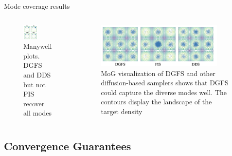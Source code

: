 \documentclass[aspectratio=169,xcolor=dvipsnames]{beamer}
\begin{document}
\begin{frame}[t]{Mode coverage results}

\begin{columns}[t]
\begin{column}{0.48\textwidth}
\begin{figure}
    \centering
    \includegraphics[width=0.5\textwidth]{figures/mode.png}
    \caption{Manywell plots. DGFS and DDS but not PIS recover all modes}
\end{figure}
\end{column}
\begin{column}{0.48\textwidth}
\begin{figure}
    \centering
    \includegraphics[width=0.9\textwidth]{figures/MoG.png}
    \caption{MoG visualization of DGFS and other diffusion-based samplers shows that DGFS could capture the diverse modes well. The contours display the landscape of the target density}
\end{figure}
\end{column}
\end{columns}
    
\end{frame}

\subsection{Convergence Guarantees}
\end{document}
